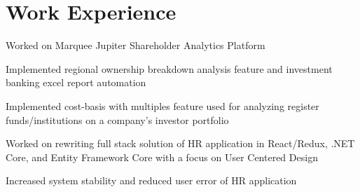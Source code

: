 \documentclass[]{deedy-resume-openfont}
\begin{document}
\begin{minipage}[t]{0.32\textwidth}
\sectionsep

%
%

\end{minipage} 
\hfill
\begin{minipage}[t]{0.66\textwidth} 


\section{Work Experience}

\sectionsep

\vspace{\topsep} %
\begin{tightemize}\item Worked on Marquee Jupiter Shareholder Analytics Platform \item Implemented regional ownership breakdown analysis feature and investment banking excel report automation \item Implemented cost-basis with multiples feature used for analyzing register funds/institutions on a company's investor portfolio 
\end{tightemize}
\sectionsep

\begin{tightemize}\item Worked on rewriting full stack solution of HR application in React/Redux, .NET Core, and Entity Framework Core with a focus on User Centered Design \item Increased system stability and reduced user error of HR application
\end{tightemize}
\sectionsep


\end{minipage}
\end{document}
